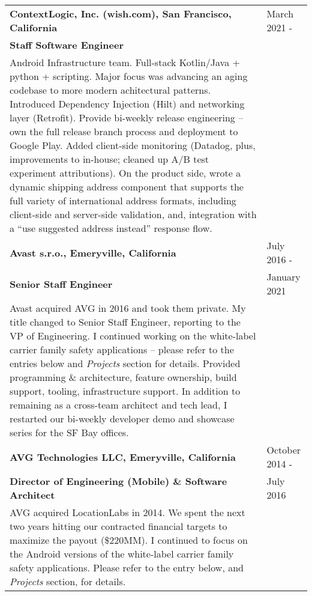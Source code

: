 \begin{tabular}{p{5.2in}@{\hspace{1.5cm}}l}

	\bf  ContextLogic, Inc. (wish.com), San Francisco, California   	    & March 2021 -  \\
	\bf  Staff Software Engineer	&  \\[4pt]
	
	   Android Infrastructure team. Full-stack Kotlin/Java + python + scripting.  
	   Major focus was advancing an aging codebase to more
	   modern achitectural patterns.  Introduced Dependency Injection (Hilt) and
	   networking layer (Retrofit).  Provide bi-weekly release engineering -- own the full release branch process and 
	   deployment to Google Play.  Added client-side monitoring
	   (Datadog, plus, improvements to in-house; cleaned up A/B test experiment attributions). 
	   On the product side, wrote a dynamic
	   shipping address component that supports the full variety of international address formats,
	   including client-side and server-side validation, and, integration with a 
	   ``use suggested address instead'' response flow.  
		 \\[9pt]


	\bf  Avast s.r.o., Emeryville, California   	    & July 2016 -  \\
	\bf  Senior Staff Engineer	& January 2021 \\[4pt]
	
	   Avast acquired AVG in 2016 and took them private.  My title changed to Senior Staff Engineer,
	   reporting to the VP of Engineering. 
	   I continued working on the white-label carrier family safety applications --
           please refer to the entries below and {\it Projects} section for details.
	   Provided programming \& architecture, 
		feature ownership, build support, tooling, infrastructure support. 
	    In addition to remaining as a cross-team architect and tech lead,
	   I restarted our bi-weekly developer demo and showcase series for the SF Bay offices.
		 \\[9pt]
	   
	\bf AVG Technologies LLC, Emeryville, California   	& October 2014 -  \\
	\bf  Director of Engineering (Mobile)  \& Software Architect 	& July 2016 \\[4pt]
	
	   AVG acquired LocationLabs in 2014. We spent the next two years hitting our contracted
	   financial targets to maximize the payout (\$220MM).   
	   I continued to focus on the Android versions of the white-label carrier family safety applications.
	   Please refer to the entry below, and {\it Projects} section, for details. \\[9pt]
	   
	
	   

\end{tabular}

